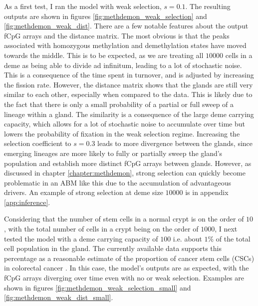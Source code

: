 As a first test, I ran the model with weak selection, $s=0.1$. The resulting
outputs are shown in figures \ref{fig:methdemon_weak_selection} and
\ref{fig:methdemon_weak_dist}. There are a few notable features about the
output fCpG arrays and the distance matrix. The most obvious is that the peaks
associated with homozygous methylation and demethylation states have moved
towards the middle. This is to be expected, as we are treating all $10000$ cells
in a deme as being able to divide ad infinitum, leading to a lot of stochastic
noise. This is a consequence of the time spent in turnover, and is adjusted by
increasing the fission rate. However, the distance matrix shows that the glands
are still very similar to each other, especially when compared to the data. This
is likely due to the fact that there is only a small probability of a partial or
full sweep of a lineage within a gland. The similarity is a consequence of the
large deme carrying capacity, which allows for a lot of stochastic noise to
accumulate over time but lowers the probability of fixation in the weak
selection regime. Increasing the selection coefficient to $s=0.3$ leads to more
divergence between the glands, since emerging lineages are more likely to fully
or partially sweep the gland's population and establish more distinct fCpG
arrays between glands. However, as discussed in chapter \ref{chapter:methdemon},
strong selection can quickly become problematic in an ABM like this due to the
accumulation of advantageous drivers. An example of strong selection at deme
size $10000$ is in appendix \ref{app:inference}. \par
Considering that the number of stem cells in a normal crypt is on the order of
$10$ \cite{gehart_tales_2019, gabbutt_fluctuating_2022}, with the total number
of cells in a crypt being on the order of $1000$, I next tested the model with
a deme carrying capacity of $100$ i.e. about $1\%$ of the total cell population
in the gland. The currently available data supports this percentage as a
reasonable estimate of the proportion of cancer stem cells (CSCs) in colorectal
cancer \cite{obrien_human_2007, munro_cancer_2018}. In this case, the model's
outputs are as expected, with the fCpG arrays diverging over time even with no
or weak selection. Examples are shown in figures
\ref{fig:methdemon_weak_selection_small} and
\ref{fig:methdemon_weak_dist_small}.

